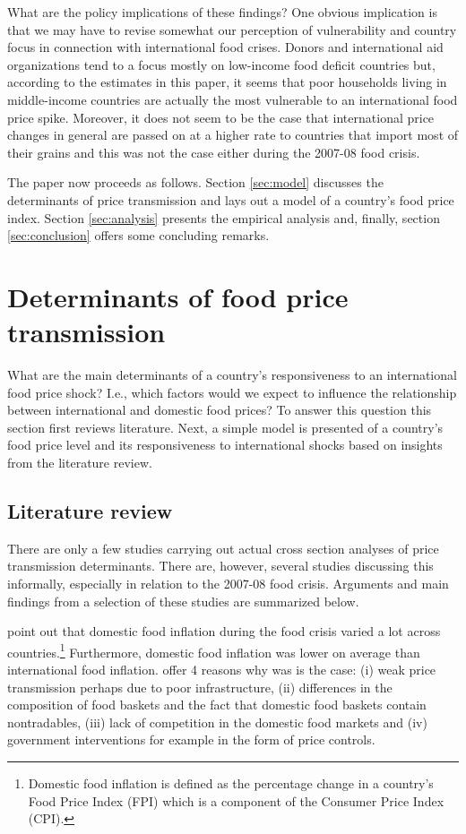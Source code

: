 \documentclass[12pt,english]{article}
\begin{document}
What are the policy implications of these findings? One obvious implication is that we may have to revise somewhat our perception of vulnerability and country focus in connection with international food crises. Donors and international aid organizations tend to a focus mostly on low-income food deficit countries but, according to the estimates in this paper, it seems that poor households living in middle-income countries are actually the most vulnerable to an international food price spike. Moreover, it does not seem to be the case that international price changes in general are passed on at a higher rate to countries that import most of their grains and this was not the case either during the 2007-08 food crisis.

The paper now proceeds as follows. Section \ref{sec:model} discusses the determinants of price transmission and lays out a model of a country's food price index. Section \ref{sec:analysis} presents the empirical analysis and, finally, section \ref{sec:conclusion} offers some concluding remarks.

\section{Determinants of food price transmission\label{sec:model}}
What are the main determinants of a country's responsiveness to an international food price shock? I.e., which factors would we expect to influence the relationship between international and domestic food prices? To answer this question this section first reviews literature. Next, a simple model is presented of a country's food price level and its responsiveness to international shocks based on insights from the literature review. 

\subsection{Literature review}
There are only a few studies carrying out actual cross section analyses of price transmission determinants. There are, however, several studies discussing this informally, especially in relation to the 2007-08 food crisis. Arguments and main findings from a selection of these studies are summarized below.

\citet{Hoyos2011} point out that domestic food inflation during the food crisis varied a lot across countries.\footnote{Domestic food inflation is defined as the percentage change in a country's Food Price Index (FPI) which is a component of the Consumer Price Index (CPI).} Furthermore, domestic food inflation was lower on average than international food inflation. \citeauthor{Hoyos2011} offer 4 reasons why was is the case: (i) weak price transmission perhaps due to poor infrastructure, (ii) differences in the composition of food baskets and the fact that domestic food baskets contain nontradables, (iii) lack of competition in the domestic food markets and (iv) government interventions for example in the form of price controls.
\end{document}
